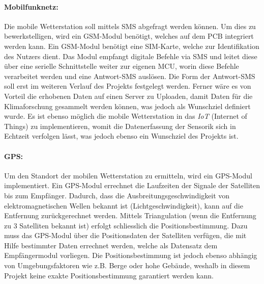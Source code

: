 \paragraph{Mobilfunknetz:}
Die mobile Wetterstation soll mittels SMS abgefragt werden können. Um dies zu bewerkstelligen, wird ein GSM-Modul benötigt, welches auf dem PCB integriert werden kann. Ein GSM-Modul benötigt eine SIM-Karte, welche zur Identifikation des Nutzers dient. Das Modul empfangt digitale Befehle via SMS und leitet diese über eine serielle Schnittstelle weiter zur eigenen MCU, worin diese Befehle verarbeitet werden und eine Antwort-SMS auslösen. Die Form der Antwort-SMS soll erst im weiteren Verlauf des Projekts festgelegt werden. Ferner wäre es von Vorteil die erhobenen Daten auf einen Server zu Uploaden, damit Daten für die Klimaforschung gesammelt werden können, was jedoch als Wunschziel definiert wurde. Es ist ebenso möglich die mobile Wetterstation in das \textit{IoT} (Internet of Things) zu implementieren, womit die Datenerfassung der Sensorik sich in Echtzeit verfolgen lässt, was jedoch ebenso ein Wunschziel des Projekts ist. \\

\paragraph{GPS:}
Um den Standort der mobilen Wetterstation zu ermitteln, wird ein GPS-Modul implementiert. Ein GPS-Modul errechnet die Laufzeiten der Signale der Satelliten bis zum Empfänger. Dadurch, dass die Ausbreitungsgeschwindigkeit von elektromagnetischen Wellen bekannt ist (Lichtgeschwindigkeit), kann auf die Entfernung zurückgerechnet werden. Mittels Triangulation (wenn die Entfernung zu 3 Satelliten bekannt ist) erfolgt schliesslich die Positionsbestimmung. Dazu muss das GPS-Modul über die Positionsdaten der Satelliten verfügen, die mit Hilfe bestimmter Daten errechnet werden, welche als Datensatz dem Empfängermodul vorliegen. Die Positionsbestimmung ist jedoch ebenso abhängig von Umgebungsfaktoren wie z.B. Berge oder hohe Gebäude, weshalb in diesem Projekt keine exakte Positionsbestimmung garantiert werden kann.\\